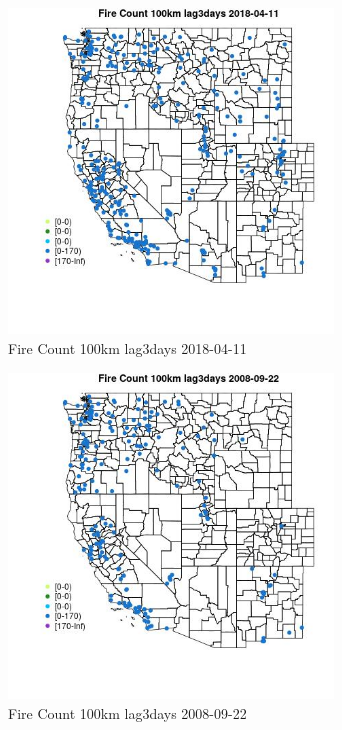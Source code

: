 \begin{figure} 
\centering  
\includegraphics[width=0.77\textwidth]{Code_Outputs/Report_ML_input_PM25_Step4_part_e_de_duplicated_aves_compiled_2019-05-18wNAs_MapObsFire_Count_100km_lag3days2018-04-11.jpg} 
\caption{\label{fig:Report_ML_input_PM25_Step4_part_e_de_duplicated_aves_compiled_2019-05-18wNAsMapObsFire_Count_100km_lag3days2018-04-11}Fire Count 100km lag3days 2018-04-11} 
\end{figure} 
 

\begin{figure} 
\centering  
\includegraphics[width=0.77\textwidth]{Code_Outputs/Report_ML_input_PM25_Step4_part_e_de_duplicated_aves_compiled_2019-05-18wNAs_MapObsFire_Count_100km_lag3days2008-09-22.jpg} 
\caption{\label{fig:Report_ML_input_PM25_Step4_part_e_de_duplicated_aves_compiled_2019-05-18wNAsMapObsFire_Count_100km_lag3days2008-09-22}Fire Count 100km lag3days 2008-09-22} 
\end{figure} 
 

